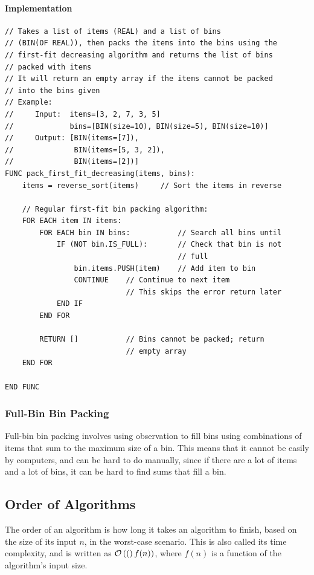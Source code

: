             \paragraph{Implementation}
                \begin{verbatim}
// Takes a list of items (REAL) and a list of bins 
// (BIN(OF REAL)), then packs the items into the bins using the
// first-fit decreasing algorithm and returns the list of bins
// packed with items
// It will return an empty array if the items cannot be packed
// into the bins given
// Example:
//     Input:  items=[3, 2, 7, 3, 5]
//             bins=[BIN(size=10), BIN(size=5), BIN(size=10)]
//     Output: [BIN(items=[7]),
//              BIN(items=[5, 3, 2]),
//              BIN(items=[2])]
FUNC pack_first_fit_decreasing(items, bins):
    items = reverse_sort(items)     // Sort the items in reverse

    // Regular first-fit bin packing algorithm:
    FOR EACH item IN items:
        FOR EACH bin IN bins:           // Search all bins until
            IF (NOT bin.IS_FULL):       // Check that bin is not
                                        // full
                bin.items.PUSH(item)    // Add item to bin
                CONTINUE    // Continue to next item
                            // This skips the error return later
            END IF
        END FOR

        RETURN []           // Bins cannot be packed; return
                            // empty array
    END FOR

END FUNC
            \end{verbatim}

        \subsubsection{Full-Bin Bin Packing}
            Full-bin bin packing involves using observation to fill bins using combinations of items that sum to the maximum size of a bin.
            This means that it cannot be easily by computers, and can be hard to do manually, since if there are a lot of items and a lot of bins, it can be hard to find sums that fill a bin.

    \newpage
    
    \subsection{Order of Algorithms}
        The order of an \gls{algorithm} is how long it takes an \gls{algorithm} to finish, based on the size of its input $n$, in the worst-case scenario.
        This is also called its time complexity, and is written as $\mathcal{O}\left((\right){f(n)})$, where $f(n)$ is a function of the \gls{algorithm}'s input size.

